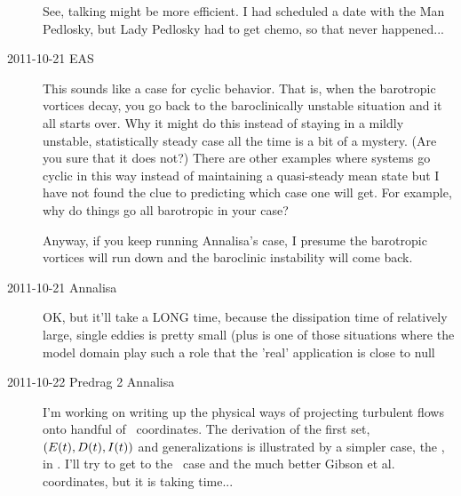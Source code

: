 \begin{description}
See, talking might be more efficient. I had scheduled a date with
the Man Pedlosky, but Lady Pedlosky had to get chemo, so that never
happened...

\item[2011-10-21 EAS]
This sounds like a case for cyclic behavior.  That is, when the
barotropic vortices decay, you go back to the baroclinically unstable
situation and it all starts over.   Why it might do this instead of
staying in a mildly unstable, statistically steady case all the time
is a bit of a mystery.  (Are you sure that it does not?)   There are
other examples where systems go cyclic in this way instead of
maintaining a quasi-steady mean state but I have not found the
clue to predicting which case one will get.  For example, why do
things go all barotropic in your case?

Anyway, if you keep running Annalisa's case, I presume the
barotropic vortices will run down and the baroclinic instability
will come back.

\item[2011-10-21 Annalisa]
OK, but it'll take a LONG time, because the dissipation time of
relatively large, single eddies is pretty small (plus is one of those
situations where the model domain play such a role that the 'real'
application is close to null

\item[2011-10-22 Predrag 2 Annalisa] I'm working on writing up
the physical ways of projecting turbulent flows onto handful of
\statesp\ coordinates. The derivation of the first set,
$(E(t),D(t),I(t))$ and generalizations is illustrated by
a simpler case, the \KSe, in . I'll try to get to
the \NS\ case and the much better Gibson et al. coordinates, but it
is taking time...




\end{description}
